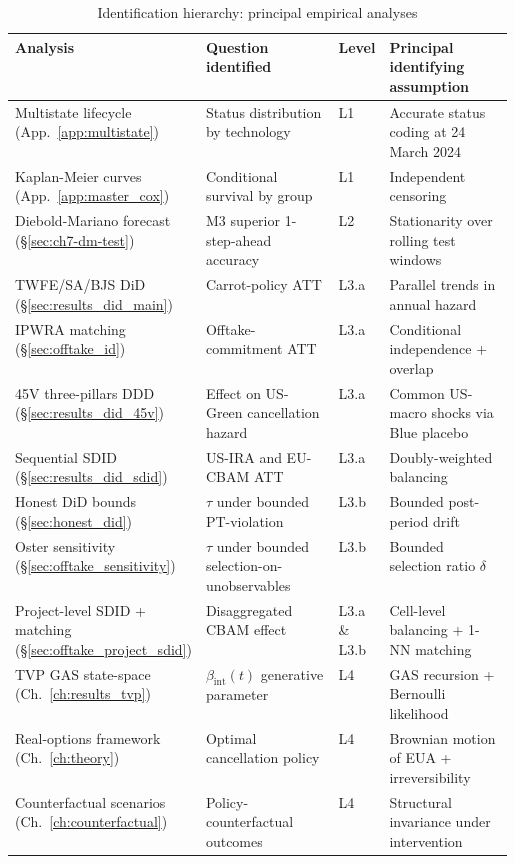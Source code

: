 \begin{table}[!htbp]
\centering
\caption{Identification hierarchy: principal empirical analyses}
\label{tab:methods_identification_hierarchy}
\begin{tabular}{lp{0.30\linewidth}lp{0.28\linewidth}}
\toprule
Analysis & Question identified & Level & Principal identifying assumption \\
\midrule
Multistate lifecycle (App.~\ref{app:multistate}) & Status distribution by technology & L1 & Accurate status coding at 24 March 2024 \\
Kaplan-Meier curves (App.~\ref{app:master_cox}) & Conditional survival by group & L1 & Independent censoring \\
Diebold-Mariano forecast (\S\ref{sec:ch7-dm-test}) & M3 superior 1-step-ahead accuracy & L2 & Stationarity over rolling test windows \\
TWFE/SA/BJS DiD (\S\ref{sec:results_did_main}) & Carrot-policy ATT & L3.a & Parallel trends in annual hazard \\
IPWRA matching (\S\ref{sec:offtake_id}) & Offtake-commitment ATT & L3.a & Conditional independence + overlap \\
45V three-pillars DDD (\S\ref{sec:results_did_45v}) & Effect on US-Green cancellation hazard & L3.a & Common US-macro shocks via Blue placebo \\
Sequential SDID (\S\ref{sec:results_did_sdid}) & US-IRA and EU-CBAM ATT & L3.a & Doubly-weighted balancing \\
Honest DiD bounds (\S\ref{sec:honest_did}) & $\tau$ under bounded PT-violation & L3.b & Bounded post-period drift \\
Oster sensitivity (\S\ref{sec:offtake_sensitivity}) & $\tau$ under bounded selection-on-unobservables & L3.b & Bounded selection ratio $\delta$ \\
Project-level SDID + matching (\S\ref{sec:offtake_project_sdid}) & Disaggregated CBAM effect & L3.a \& L3.b & Cell-level balancing + 1-NN matching \\
TVP GAS state-space (Ch.~\ref{ch:results_tvp}) & $\beta_{\mathrm{int}}(t)$ generative parameter & L4 & GAS recursion + Bernoulli likelihood \\
Real-options framework (Ch.~\ref{ch:theory}) & Optimal cancellation policy & L4 & Brownian motion of EUA + irreversibility \\
Counterfactual scenarios (Ch.~\ref{ch:counterfactual}) & Policy-counterfactual outcomes & L4 & Structural invariance under intervention \\
\bottomrule
\end{tabular}
\end{table}

